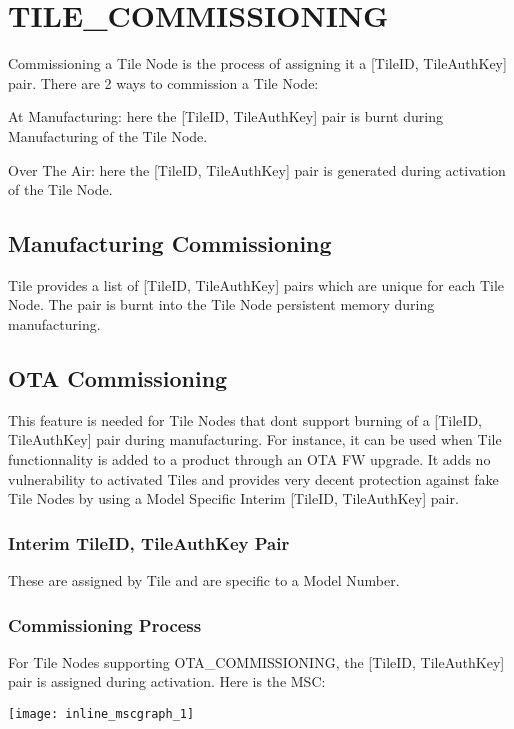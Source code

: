 \hypertarget{group___t_i_l_e___c_o_m_m_i_s_s_i_o_n_i_n_g}{}\section{T\+I\+L\+E\+\_\+\+C\+O\+M\+M\+I\+S\+S\+I\+O\+N\+I\+NG}
\label{group___t_i_l_e___c_o_m_m_i_s_s_i_o_n_i_n_g}
Commissioning a Tile Node is the process of assigning it a \mbox{[}Tile\+ID, Tile\+Auth\+Key\mbox{]} pair. There are 2 ways to commission a Tile Node\+:
\begin{DoxyItemize}
\item At Manufacturing\+: here the \mbox{[}Tile\+ID, Tile\+Auth\+Key\mbox{]} pair is burnt during Manufacturing of the Tile Node.
\item Over The Air\+: here the \mbox{[}Tile\+ID, Tile\+Auth\+Key\mbox{]} pair is generated during activation of the Tile Node.
\end{DoxyItemize}

\subsection*{Manufacturing Commissioning}

Tile provides a list of \mbox{[}Tile\+ID, Tile\+Auth\+Key\mbox{]} pairs which are unique for each Tile Node. The pair is burnt into the Tile Node persistent memory during manufacturing.

\subsection*{O\+TA Commissioning}

This feature is needed for Tile Nodes that don\textquotesingle{}t support burning of a \mbox{[}Tile\+ID, Tile\+Auth\+Key\mbox{]} pair during manufacturing. For instance, it can be used when Tile functionnality is added to a product through an O\+TA FW upgrade. It adds no vulnerability to activated Tiles and provides very decent protection against fake Tile Nodes by using a Model Specific Interim \mbox{[}Tile\+ID, Tile\+Auth\+Key\mbox{]} pair.

\subsubsection*{Interim Tile\+ID, Tile\+Auth\+Key Pair}

These are assigned by Tile and are specific to a Model Number.

\subsubsection*{Commissioning Process}

For Tile Nodes supporting O\+T\+A\+\_\+\+C\+O\+M\+M\+I\+S\+S\+I\+O\+N\+I\+NG, the \mbox{[}Tile\+ID, Tile\+Auth\+Key\mbox{]} pair is assigned during activation. Here is the M\+SC\+:


\begin{DoxyImageNoCaption}
  \mbox{\texttt{[image: inline\_mscgraph\_1]}}
\end{DoxyImageNoCaption}
 